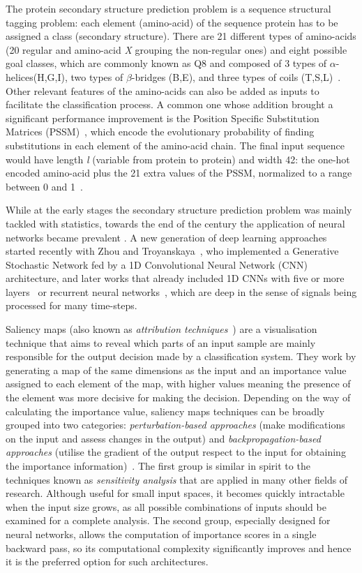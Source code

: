 \documentclass{article}
\begin{document}
The protein secondary structure prediction problem is a sequence structural tagging problem: each element (amino-acid) of the sequence protein has to be assigned a class (secondary structure). There are 21 different types of amino-acids (20 regular and amino-acid \textit{X} grouping the non-regular ones) and eight possible goal classes, which are commonly known as Q8 and composed of 3 types of $\alpha$-helices(H,G,I), two types of $\beta$-bridges (B,E), and three types of coils (T,S,L)~\cite{Kabsch1983}. Other relevant features of the amino-acids can also be added as inputs to facilitate the classification process. A common one whose addition brought a significant performance improvement is the Position Specific Substitution Matrices (PSSM)~\cite{Yang2018}, which encode the evolutionary probability of finding substitutions in each element of the amino-acid chain. The final input sequence would have length \textit{l} (variable from protein to protein) and width 42: the one-hot encoded amino-acid plus the 21 extra values of the PSSM, normalized to a range between 0 and 1~\cite{Busia2017}.

While at the early stages the secondary structure prediction problem was mainly tackled with statistics, towards the end of the century the application of neural networks became prevalent \cite{Rost1993}. A new generation of deep learning approaches started recently with Zhou and Troyanskaya~\cite{Zhou2014}, who implemented a Generative Stochastic Network fed by a 1D Convolutional Neural Network (CNN) architecture, and later works that already included 1D CNNs with five or more layers~\cite{Fang2017,Zhou2018} or recurrent neural networks~\cite{Li2016,Jurtz2017}, which are deep in the sense of signals being processed for many time-steps.

Saliency maps (also known as \textit{attribution techniques}~\cite{Olah2017}) are a visualisation technique that aims to reveal which parts of an input sample are mainly responsible for the output decision made by a classification system. They work by generating a map of the same dimensions as the input and an importance value assigned to each element of the map, with higher values meaning the presence of the element was more decisive for making the decision. Depending on the way of calculating the importance value, saliency maps techniques can be broadly grouped into two categories: \textit{perturbation-based approaches} (make modifications on the input and assess changes in the output) and \textit{backpropagation-based approaches} (utilise the gradient of the output respect to the input for obtaining the importance information)~\cite{Shrikumar2017}. The first group is similar in spirit to the techniques known as \textit{sensitivity analysis} that are applied in many other fields of research. Although useful for small input spaces, it becomes quickly intractable when the input size grows, as all possible combinations of inputs should be examined for a complete analysis. The second group, especially designed for neural networks, allows the computation of importance scores in a single backward pass, so its computational complexity significantly improves and hence it is the preferred option for such architectures.
\end{document}

